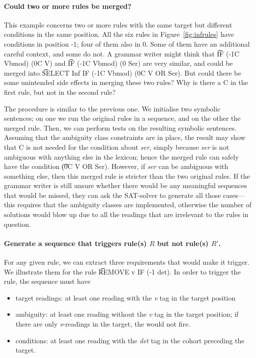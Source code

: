 {{\paragraph{Could two or more rules be merged?} This example concerns two or more rules with the same target but different conditions in the same position. 
All the six rules in Figure~\ref{fig:infrules} have conditions in position -1; four of them also in 0. Some of them have an additional careful context, and some do not.
A grammar writer might think that \t{IF (-1C Vbmod) (0C V)} and \t{IF (-1C Vbmod) (0 Ser)} are very similar, and could be merged into \t{SELECT Inf IF (-1C Vbmod) (0C V OR Ser)}. But could there be some unintended side effects in merging these two rules? Why is there a C in the first rule, but not in the second rule? 

The procedure is similar to the previous one. We initialise two symbolic sentences; on one we run the original rules in a sequence, and on the other the merged rule. 
Then, we can perform tests on the resulting symbolic sentences. Assuming that the ambiguity class constraints are in place, the result may show that C is not needed for the condition about {\em ser}, simply because {\em ser} is not ambiguous with anything else in the lexicon; hence the merged rule can safely have the condition \t{(0C V OR Ser)}. However, if {\em ser} can be ambiguous with something else, then this merged rule is stricter than the two original rules. If the grammar writer is still unsure whether there would be any meaningful sequences that would be missed, they can ask the SAT-solver to generate all those cases---this requires that the ambiguity classes are implemented, 
otherwise the number of solutions would blow up due to all the readings that are irrelevant to the rules in question.

\paragraph{Generate a sequence that triggers rule(s) $R$ but not rule(s) $R'$.}
For any given rule, we can extract three requirements that would make it trigger. We illustrate them for the rule \t{REMOVE v IF (-1 det)}. In order to trigger the rule, the sequence must have
\begin{itemize}
\item target readings: at least one reading with the \emph{v} tag in the target position
\item ambiguity: at least one reading without the \emph{v} tag in the target position; if there are only \emph{v}-readings in the target, the would not fire.
\item conditions: at least one reading with the \emph{det} tag in the cohort preceding the target.
\end{itemize}

}}
